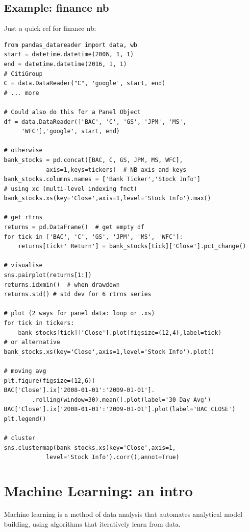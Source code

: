 \documentclass[11pt]{article}
\begin{document}
\subsection{Example: finance nb}
Just a quick ref for finance nb:
\begin{lstlisting}
from pandas_datareader import data, wb
start = datetime.datetime(2006, 1, 1)
end = datetime.datetime(2016, 1, 1)
# CitiGroup
C = data.DataReader("C", 'google', start, end)
# ... more

# Could also do this for a Panel Object
df = data.DataReader(['BAC', 'C', 'GS', 'JPM', 'MS',
	 'WFC'],'google', start, end)

# otherwise
bank_stocks = pd.concat([BAC, C, GS, JPM, MS, WFC],
			axis=1,keys=tickers)  # NB axis and keys
bank_stocks.columns.names = ['Bank Ticker','Stock Info']
# using xc (multi-level indexing fnct)
bank_stocks.xs(key='Close',axis=1,level='Stock Info').max()

# get rtrns
returns = pd.DataFrame()  # get empty df
for tick in ['BAC', 'C', 'GS', 'JPM', 'MS', 'WFC']:  
	returns[tick+' Return'] = bank_stocks[tick]['Close'].pct_change()

# visualise
sns.pairplot(returns[1:])
returns.idxmin()  # when drawdown
returns.std() # std dev for 6 rtrns series

# plot (2 ways for panel data: loop or .xs)
for tick in tickers:
	bank_stocks[tick]['Close'].plot(figsize=(12,4),label=tick)
# or alternative
bank_stocks.xs(key='Close',axis=1,level='Stock Info').plot()

# moving avg
plt.figure(figsize=(12,6))
BAC['Close'].ix['2008-01-01':'2009-01-01'].
		.rolling(window=30).mean().plot(label='30 Day Avg')
BAC['Close'].ix['2008-01-01':'2009-01-01'].plot(label='BAC CLOSE')
plt.legend()

# cluster
sns.clustermap(bank_stocks.xs(key='Close',axis=1,
			level='Stock Info').corr(),annot=True)
\end{lstlisting}

\section{Machine Learning: an intro} \label{sec:Machine}
Machine learning is a method of data analysis that automates analytical model building, using algorithms that iteratively learn from data.
\end{document}
